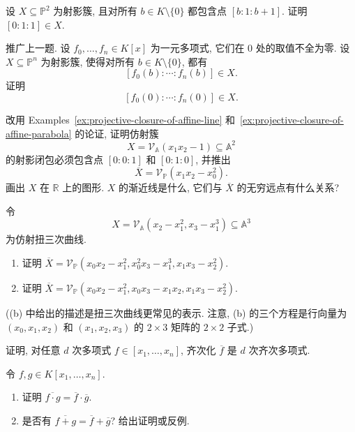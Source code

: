 \BookExerciseHeading
\begin{BookExercises}
  \item\label{ex:line-limit-point-belongs-to-projective-variety} 设 $X\subseteq\mathbb{P}^{2}$ 为射影簇, 且对所有 $b\in K\setminus\{0\}$ 都包含点 $[b:1:b+1]$. 证明 $[0:1:1]\in X$.
  \item\label{ex:projective-variety-contains-parameter-zero-limit} 推广上一题. 设 $f_{0},\ldots,f_{n}\in K[x]$ 为一元多项式, 它们在 $0$ 处的取值不全为零. 设 $X\subseteq\mathbb{P}^{n}$ 为射影簇, 使得对所有 $b\in K\setminus\{0\}$, 都有
  \[
    [f_{0}(b):\cdots:f_{n}(b)]\in X.
  \]
  证明
  \[
    [f_{0}(0):\cdots:f_{n}(0)]\in X.
  \]
  \item\label{ex:projective-closure-of-affine-hyperbola} 改用 Examples~\ref{ex:projective-closure-of-affine-line} 和~\ref{ex:projective-closure-of-affine-parabola} 的论证, 证明仿射簇
  \[
    X=\mathcal{V}_{\mathbb{A}}(x_{1}x_{2}-1)\subseteq\mathbb{A}^{2}
  \]
  的射影闭包必须包含点 $[0:0:1]$ 和 $[0:1:0]$, 并推出
  \[
    \overline{X}=\mathcal{V}_{\mathbb{P}}(x_{1}x_{2}-x_{0}^{2}).
  \]
  画出 $X$ 在 $\mathbb{R}$ 上的图形. $X$ 的渐近线是什么, 它们与 $\overline{X}$ 的无穷远点有什么关系?
  \item\label{ex:equations-for-projective-twisted-cubic} 令
  \[
    X=\mathcal{V}_{\mathbb{A}}(x_{2}-x_{1}^{2},x_{3}-x_{1}^{3})\subseteq\mathbb{A}^{3}
  \]
  为仿射扭三次曲线.
  \begin{enumerate}
    \item 证明 $\overline{X}=\mathcal{V}_{\mathbb{P}}(x_{0}x_{2}-x_{1}^{2},x_{0}^{2}x_{3}-x_{1}^{3},x_{1}x_{3}-x_{2}^{2})$.
    \item 证明 $\overline{X}=\mathcal{V}_{\mathbb{P}}(x_{0}x_{2}-x_{1}^{2},x_{0}x_{3}-x_{1}x_{2},x_{1}x_{3}-x_{2}^{2})$.
  \end{enumerate}
  ((b) 中给出的描述是扭三次曲线更常见的表示. 注意, (b) 的三个方程是行向量为 $(x_{0},x_{1},x_{2})$ 和 $(x_{1},x_{2},x_{3})$ 的 $2\times3$ 矩阵的 $2\times2$ 子式.)
  \item\label{ex:homogenization-is-homogeneous-of-same-degree} 证明, 对任意 $d$ 次多项式 $f\in[x_{1},\ldots,x_{n}]$, 齐次化 $\overline{f}$ 是 $d$ 次齐次多项式.
  \item\label{ex:homogenization-multiplication-and-addition} 令 $f,g\in K[x_{1},\ldots,x_{n}]$.
  \begin{enumerate}
    \item 证明 $\overline{f\cdot g}=\overline{f}\cdot\overline{g}$.
    \item 是否有 $\overline{f+g}=\overline{f}+\overline{g}$? 给出证明或反例.

\end{enumerate}
\end{BookExercises}

